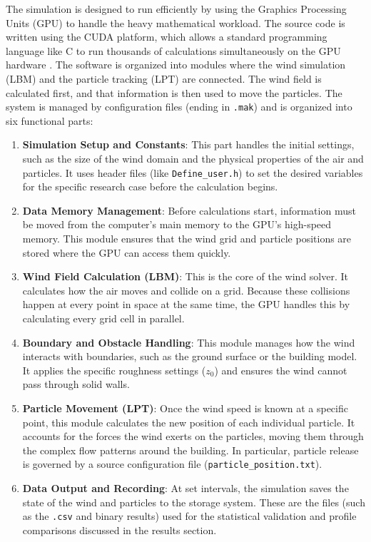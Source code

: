 The simulation is designed to run efficiently by using the Graphics Processing Units (GPU) to handle the heavy mathematical workload. The source code is written using the CUDA platform, which allows a standard programming language like C to run thousands of calculations simultaneously on the GPU hardware \parencite{nvidiaCUDA}. The software is organized into modules where the wind simulation (LBM) and the particle tracking (LPT) are connected. The wind field is calculated first, and that information is then used to move the particles. The system is managed by configuration files (ending in \texttt{.mak}) and is organized into six functional parts:

\begin{enumerate}
    \item \textbf{Simulation Setup and Constants}: This part handles the initial settings, such as the size of the wind domain and the physical properties of the air and particles. It uses header files (like \texttt{Define\_user.h}) to set the desired variables for the specific research case before the calculation begins.
    \item \textbf{Data Memory Management}: Before calculations start, information must be moved from the computer's main memory to the GPU's high-speed memory. This module ensures that the wind grid and particle positions are stored where the GPU can access them quickly.
    \item \textbf{Wind Field Calculation (LBM)}: This is the core of the wind solver. It calculates how the air moves and collide on a grid. Because these collisions happen at every point in space at the same time, the GPU handles this by calculating every grid cell in parallel.
    \item \textbf{Boundary and Obstacle Handling}: This module manages how the wind interacts with boundaries, such as the ground surface or the building model. It applies the specific roughness settings ($z_0$) and ensures the wind cannot pass through solid walls.
    \item \textbf{Particle Movement (LPT)}: Once the wind speed is known at a specific point, this module calculates the new position of each individual particle. It accounts for the forces the wind exerts on the particles, moving them through the complex flow patterns around the building. In particular, particle release is governed by a source configuration file (\texttt{particle\_position.txt}).
    \item \textbf{Data Output and Recording}: At set intervals, the simulation saves the state of the wind and particles to the storage system. These are the files (such as the \texttt{.csv} and binary results) used for the statistical validation and profile comparisons discussed in the results section.
\end{enumerate}

